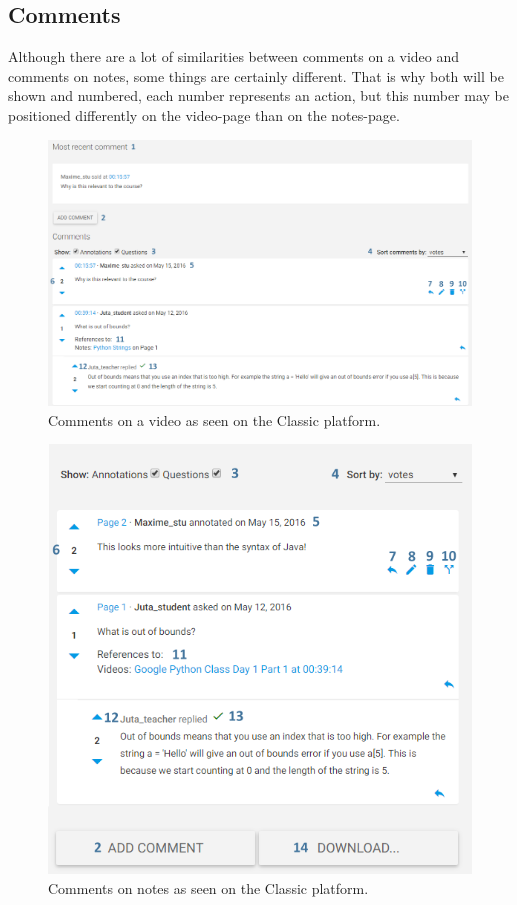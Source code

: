 \documentclass[a4paper,11pt]{report}
\begin{document}
\subsection{Comments}
\label{stu:comments}
Although there are a lot of similarities between comments on a video and comments on notes, some things are certainly different. That is why both will be shown and numbered, each number represents an action, but this number may be positioned differently on the video-page than on the notes-page.

\begin{figure}[H]
\centering
\includegraphics[scale=0.4]{imgs/stu_comments.png}
\caption{Comments on a video as seen on the Classic platform.}
\label{fig:stu_comments}
\end{figure}
\begin{figure}[H]
\centering
\includegraphics[scale=0.45]{imgs/stu_comments2.png}
\caption{Comments on notes as seen on the Classic platform.}
\label{fig:stu_comments2}
\end{figure}
\end{document}
